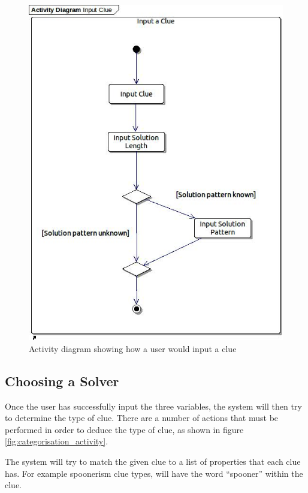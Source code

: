 \begin{figure}[H]
  \centering
  \includegraphics[scale=0.6]{activity/input_clue.jpg}
  \caption{Activity diagram showing how a user would input a clue}
  \label{fig:input_activity}
\end{figure}


\subsection{Choosing a Solver} 
\label{sub:categorisation}

Once the user has successfully input the three variables, the system will then 
try to determine the type of clue. There are a number of actions that must be 
performed in order to deduce the type of clue, as shown in figure 
\ref{fig:categorisation_activity}.

The system will try to match the given clue to a list of properties that each 
clue has. For example spoonerism clue types, will have the word ``spooner''
within the clue.

